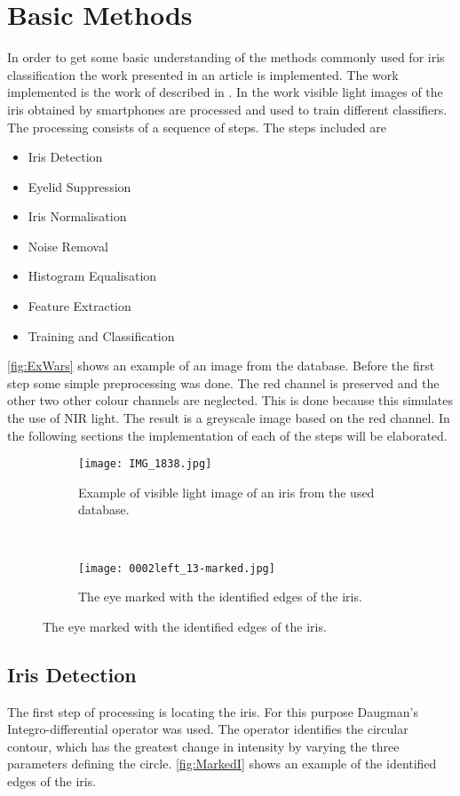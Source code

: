 \section{Basic Methods}
\label{BasicM}
In order to get some basic understanding of the methods commonly used for iris classification the work presented in an article is implemented. The work implemented is the work of \cite{Khan2017a} described in \citep{Khan2017a}. In the work visible light images of the iris obtained by smartphones are processed and used to train different classifiers. The processing consists of a sequence of steps. The steps included are

\begin{itemize}
\item Iris Detection
\item Eyelid Suppression
\item Iris Normalisation
\item Noise Removal
\item Histogram Equalisation 
\item Feature Extraction
\item Training and Classification
\end{itemize}
\autoref{fig:ExWars} shows an example of an image from the database. Before the first step some simple preprocessing was done. The red channel is preserved and the other two other colour channels are neglected. This is done because this simulates the use of NIR light. The result is a greyscale image based on the red channel. In the following sections the implementation of each of the steps will be elaborated. 

\begin{figure}[h]
\centering
\begin{subfigure}{.47\textwidth}
\centering
\texttt{[image: IMG\_1838.jpg]}
\caption{Example of visible light image of an iris from the used database.}
\label{fig:ExWars}
\end{subfigure}
~
\begin{subfigure}{.47\textwidth}
\centering
\texttt{[image: 0002left\_13-marked.jpg]}
\caption{The eye marked with the identified edges of the iris.}
\label{fig:MarkedI}
\end{subfigure}
\end{figure}



\subsection{Iris Detection}
The first step of processing is locating the iris. For this purpose Daugman's Integro-differential operator was used. The operator identifies the circular contour, which has the greatest change in intensity by varying the three parameters defining the circle. \autoref{fig:MarkedI} shows an example of the identified edges of the iris.



